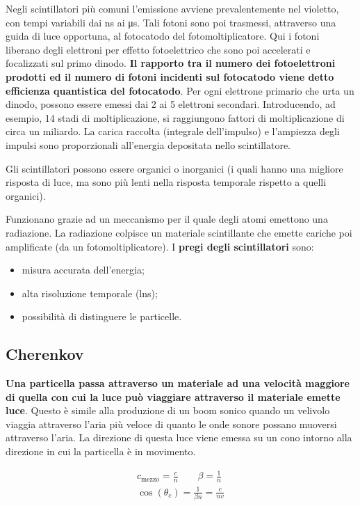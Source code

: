 \documentclass[a4paper,11pt,twoside,openany]{book}
\theoremstyle{definition}
\theoremstyle{plain}
\theoremstyle{plain}
\theoremstyle{definition}
\begin{document}
Negli scintillatori più comuni l'emissione avviene prevalentemente nel violetto, con tempi variabili dai \si{\nano\second} ai \si{\micro\second}. Tali fotoni sono poi trasmessi, attraverso una guida di luce opportuna, al fotocatodo del fotomoltiplicatore. Qui i fotoni liberano degli elettroni per effetto fotoelettrico che sono poi accelerati e focalizzati sul primo dinodo. \textbf{Il rapporto tra il numero dei fotoelettroni prodotti ed il numero di fotoni incidenti sul fotocatodo viene detto efficienza quantistica del fotocatodo}. Per ogni elettrone primario che urta un dinodo, possono essere emessi dai 2 ai 5 elettroni secondari. Introducendo, ad esempio, 14 stadi di moltiplicazione, si raggiungono fattori di moltiplicazione di circa un miliardo. La carica raccolta (integrale dell'impulso) e l'ampiezza degli impulsi sono proporzionali all'energia depositata nello scintillatore.

Gli scintillatori possono essere organici o inorganici (i quali hanno una migliore risposta di luce, ma sono più lenti nella risposta temporale rispetto a quelli organici).

Funzionano grazie ad un meccanismo per il quale degli atomi emettono una radiazione. La radiazione colpisce un materiale scintillante che emette cariche poi amplificate (da un fotomoltiplicatore). I \textbf{pregi degli scintillatori} sono:
\begin{itemize}
\item misura accurata dell'energia;
\item alta risoluzione temporale (lns);
\item possibilità di distinguere le particelle.
\end{itemize}

\subsection{Cherenkov} %
\textbf{Una particella passa attraverso un materiale ad una velocità maggiore di quella con cui la luce può viaggiare attraverso il materiale emette luce}. Questo è simile alla produzione di un boom sonico quando un velivolo viaggia attraverso l'aria più veloce di quanto le onde sonore possano muoversi attraverso l'aria. La direzione di questa luce viene emessa su un cono intorno alla direzione in cui la particella è in movimento.

\begin{equation}\begin{split}
c_{\textrm{mezzo}}=\frac{c}{n} \quad \quad \beta=\frac{1}{n} \\
\cos\left(\theta_c\right)=\frac{1}{\beta n}=\frac{c}{nv}
\end{split}\end{equation}
\end{document}
